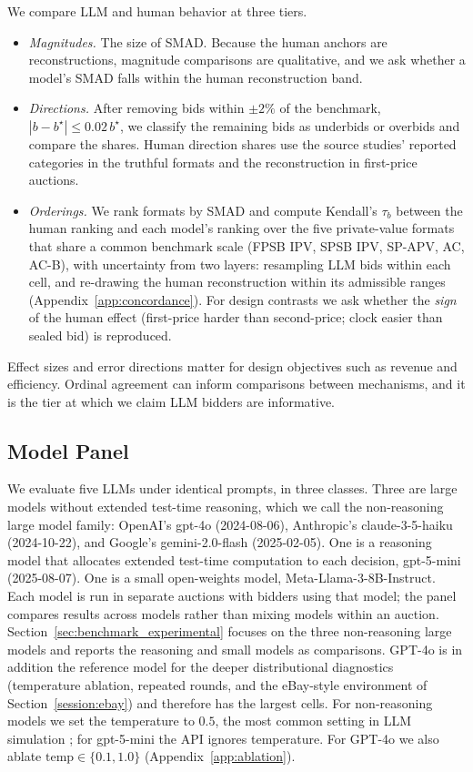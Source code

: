 \documentclass{article} %
\newif\ifmarkrev
\newcommand{\rev}[1]{\ifmarkrev\begingroup\color{red}#1\endgroup\else#1\fi}
\begin{document}
\rev{We compare LLM and human behavior at three tiers.}
\begin{itemize}
  \item \rev{\emph{Magnitudes.} The size of SMAD. Because the human anchors are reconstructions, magnitude comparisons are qualitative, and we ask whether a model's SMAD falls within the human reconstruction band.}
  \item \rev{\emph{Directions.} After removing bids within $\pm 2\%$ of the benchmark, $|b-b^\star| \le 0.02\, b^\star$, we classify the remaining bids as underbids or overbids and compare the shares. Human direction shares use the source studies' reported categories in the truthful formats and the reconstruction in first-price auctions.}
  \item \rev{\emph{Orderings.} We rank formats by SMAD and compute Kendall's $\tau_b$ between the human ranking and each model's ranking over the five private-value formats that share a common benchmark scale (FPSB IPV, SPSB IPV, SP-APV, AC, AC-B), with uncertainty from two layers: resampling LLM bids within each cell, and re-drawing the human reconstruction within its admissible ranges (Appendix~\ref{app:concordance}). For design contrasts we ask whether the \emph{sign} of the human effect (first-price harder than second-price; clock easier than sealed bid) is reproduced.}
\end{itemize}
\rev{Effect sizes and error directions matter for design objectives such as revenue and efficiency. Ordinal agreement can inform comparisons between mechanisms, and it is the tier at which we claim LLM bidders are informative.}

\subsection{\texorpdfstring{\rev{Model Panel}}{Model Panel}}\label{sec:models}

\rev{We evaluate five LLMs under identical prompts, in three classes. Three are large models without extended test-time reasoning, which we call the non-reasoning large model family: OpenAI's gpt-4o (2024-08-06), Anthropic's claude-3-5-haiku (2024-10-22), and Google's gemini-2.0-flash (2025-02-05). One is a reasoning model that allocates extended test-time computation to each decision, gpt-5-mini (2025-08-07). One is a small open-weights model, Meta-Llama-3-8B-Instruct. Each model is run in separate auctions with bidders using that model; the panel compares results across models rather than mixing models within an auction. Section~\ref{sec:benchmark_experimental} focuses on the three non-reasoning large models and reports the reasoning and small models as comparisons. GPT-4o is in addition the reference model for the deeper distributional diagnostics (temperature ablation, repeated rounds, and the eBay-style environment of Section~\ref{session:ebay}) and therefore has the largest cells. For non-reasoning models we set the temperature to $0.5$, the most common setting in LLM simulation \citep{horton2023large, Horton2024EDSL}; for gpt-5-mini the API ignores temperature. For GPT-4o we also ablate $\text{temp}\in\{0.1, 1.0\}$ (Appendix~\ref{app:ablation}).}
\end{document}
